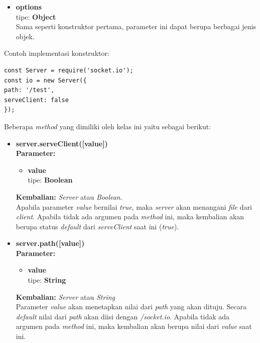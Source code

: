 \documentclass[a4paper,twoside]{article}
\begin{document}
\begin{enumerate}
\begin{enumerate}
\begin{enumerate}
\begin{itemize}
					\begin{itemize}
						\item \textbf{options} \\ tipe: \textbf{Object} \\ Sama seperti konstruktor pertama, parameter ini dapat berupa berbagai jenis objek.
					\end{itemize}
					
					Contoh implementasi konstruktor:
					
\begin{lstlisting}
const Server = require('socket.io');
const io = new Server({
path: '/test',
serveClient: false
});
\end{lstlisting}
					
				\end{itemize}
				
				Beberapa \textit{method} yang dimiliki oleh kelas ini yaitu sebagai berikut: 
				
				\begin{itemize}
					\item \textbf{server.serveClient([value])} \\ 
					\textbf{Parameter:}
					\begin{itemize}
						\item \textbf{value} \\ tipe: \textbf{Boolean}
					\end{itemize}
					\textbf{Kembalian:} \textit{Server} atau \textit{Boolean}. \\
					Apabila parameter \textit{value} bernilai \textit{true}, maka \textit{server} akan menangani \textit{file} dari \textit{client}. Apabila tidak ada argumen pada \textit{method} ini, maka kembalian akan berupa status \textit{default} dari \textit{serveClient} saat ini (\textit{true}).
					
					\item \textbf{server.path([value])} \\
					\textbf{Parameter:}
					\begin{itemize}
						\item \textbf{value} \\ tipe: \textbf{String}
					\end{itemize}
					\textbf{Kembalian:} \textit{Server} atau \textit{String} \\
					Parameter \textit{value} akan menetapkan nilai dari \textit{path} yang akan dituju. Secara \textit{default} nilai dari \textit{path} akan diisi dengan \textit{/socket.io}. Apabila tidak ada argumen pada \textit{method} ini, maka kembalian akan berupa nilai dari \textit{value} saat ini.
					

\end{itemize}
\end{enumerate}
\end{enumerate}
\end{enumerate}
\end{document}
